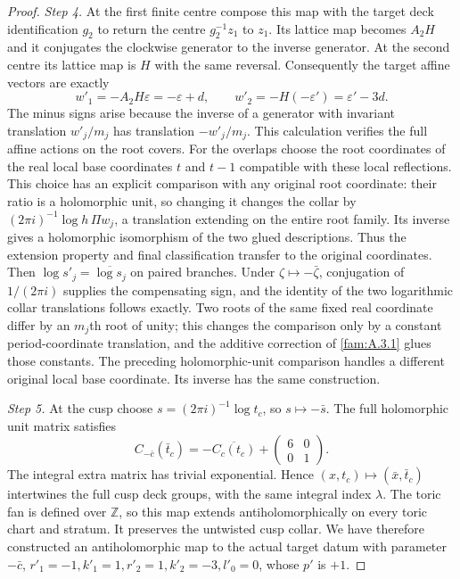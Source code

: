\begin{proof}
\par\noindent\textit{Step 4.} At the first finite centre compose this map with the target deck identification $g_2$ to return the centre $g_2^{-1}z_1$ to $z_1$. Its lattice map becomes $A_2H$ and it conjugates the clockwise generator to the inverse generator. At the second centre its lattice map is $H$ with the same reversal. Consequently the target affine vectors are exactly
\[
 w'_1=-A_2H\varepsilon=-\varepsilon+d,\qquad
 w'_2=-H(-\varepsilon')=\varepsilon'-3d.
\]
The minus signs arise because the inverse of a generator with invariant translation $w'_j/m_j$ has translation $-w'_j/m_j$. This calculation verifies the full affine actions on the root covers. For the overlaps choose the root coordinates of the real local base coordinates $t$ and $t-1$ compatible with these local reflections. This choice has an explicit comparison with any original root coordinate: their ratio is a holomorphic unit, so changing it changes the collar by $(2\pi i)^{-1}\log h\,\Pi w_j$, a translation extending on the entire root family. Its inverse gives a holomorphic isomorphism of the two glued descriptions. Thus the extension property and final classification transfer to the original coordinates. Then $\log s'_j=\overline{\log s_j}$ on paired branches. Under $\zeta\mapsto-\bar\zeta$, conjugation of $1/(2\pi i)$ supplies the compensating sign, and the identity of the two logarithmic collar translations follows exactly. Two roots of the same fixed real coordinate differ by an $m_j$th root of unity; this changes the comparison only by a constant period-coordinate translation, and the additive correction of \ref{fam:A.3.1} glues those constants. The preceding holomorphic-unit comparison handles a different original local base coordinate. Its inverse has the same construction.

\par\noindent\textit{Step 5.} At the cusp choose $s=(2\pi i)^{-1}\log t_c$, so $s\mapsto-\bar s$. The full holomorphic unit matrix satisfies
\[
 C_{-\bar c}(\bar t_c)=-\overline{C_c(t_c)}+
       \begin{pmatrix}6&0\\0&1\end{pmatrix}.
\]
The integral extra matrix has trivial exponential. Hence $(x,t_c)\mapsto(\bar x,\bar t_c)$ intertwines the full cusp deck groups, with the same integral index $\lambda$. The toric fan is defined over $\mathbb Z$, so this map extends antiholomorphically on every toric chart and stratum. It preserves the untwisted cusp collar. We have therefore constructed an antiholomorphic map to the actual target datum with parameter $-\bar c$, $r'_1=-1,k'_1=1,r'_2=1,k'_2=-3,l'_0=0$, whose $p'$ is $+1$.


\end{proof}
